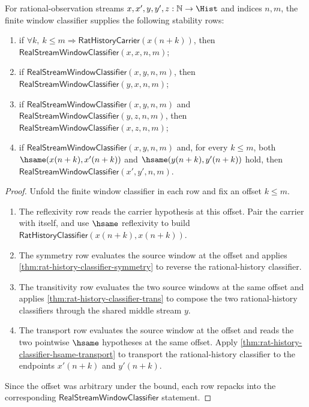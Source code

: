 \begin{theorem}
\label{thm:real-stream-window-classifier-stability-package}
For rational-observation streams $x,x',y,y',z:\mathbb{N}\to\Hist$ and indices
$n,m$, the finite window classifier supplies the following stability rows:
\begin{enumerate}
  \item if
  $\forall k,\ k\le m\Longrightarrow\mathsf{RatHistoryCarrier}(x(n+k))$,
  then $\mathsf{RealStreamWindowClassifier}(x,x,n,m)$;
  \item if $\mathsf{RealStreamWindowClassifier}(x,y,n,m)$, then
  $\mathsf{RealStreamWindowClassifier}(y,x,n,m)$;
  \item if $\mathsf{RealStreamWindowClassifier}(x,y,n,m)$ and
  $\mathsf{RealStreamWindowClassifier}(y,z,n,m)$, then
  $\mathsf{RealStreamWindowClassifier}(x,z,n,m)$;
  \item if $\mathsf{RealStreamWindowClassifier}(x,y,n,m)$ and, for every
  $k\le m$, both $\hsame(x(n+k),x'(n+k))$ and
  $\hsame(y(n+k),y'(n+k))$ hold, then
  $\mathsf{RealStreamWindowClassifier}(x',y',n,m)$.
\end{enumerate}
\end{theorem}
\begin{proof}
Unfold the finite window classifier in each row and fix an offset $k\le m$.

\begin{enumerate}
  \item The reflexivity row reads the carrier hypothesis at this offset. Pair
  the carrier with itself, and use $\hsame$ reflexivity to build
  $\mathsf{RatHistoryClassifier}(x(n+k),x(n+k))$.

  \item The symmetry row evaluates the source window at the offset and applies
  \autoref{thm:rat-history-classifier-symmetry} to reverse the rational-history
  classifier.

  \item The transitivity row evaluates the two source windows at the same
  offset and applies \autoref{thm:rat-history-classifier-trans} to compose the
  two rational-history classifiers through the shared middle stream $y$.

  \item The transport row evaluates the source window at the offset and reads
  the two pointwise $\hsame$ hypotheses at the same offset. Apply
  \autoref{thm:rat-history-classifier-hsame-transport} to transport the
  rational-history classifier to the endpoints $x'(n+k)$ and $y'(n+k)$.
\end{enumerate}

Since the offset was arbitrary under the bound, each row repacks into the
corresponding $\mathsf{RealStreamWindowClassifier}$ statement.
\end{proof}

